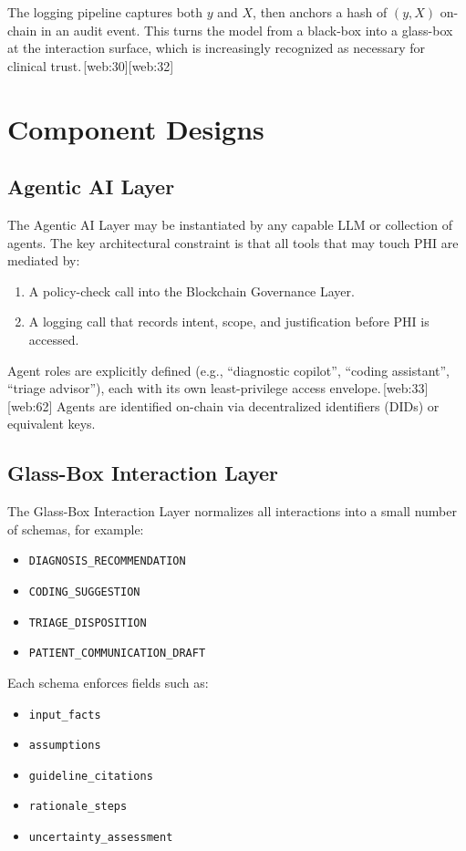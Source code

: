 \documentclass[11pt]{article}
\begin{document}
The logging pipeline captures both $y$ and $X$, then anchors a hash of $(y, X)$ on-chain in an audit event. 
This turns the model from a black-box into a glass-box at the interaction surface, which is increasingly recognized as necessary for clinical trust.\,[web:30][web:32]

\section{Component Designs}

\subsection{Agentic AI Layer}

The Agentic AI Layer may be instantiated by any capable LLM or collection of agents. 
The key architectural constraint is that all tools that may touch PHI are mediated by:
\begin{enumerate}[nosep]
  \item A policy-check call into the Blockchain Governance Layer.
  \item A logging call that records intent, scope, and justification before PHI is accessed.
\end{enumerate}

Agent roles are explicitly defined (e.g., ``diagnostic copilot'', ``coding assistant'', ``triage advisor''), each with its own least-privilege access envelope.\,[web:33][web:62] 
Agents are identified on-chain via decentralized identifiers (DIDs) or equivalent keys.

\subsection{Glass-Box Interaction Layer}

The Glass-Box Interaction Layer normalizes all interactions into a small number of schemas, for example:
\begin{itemize}[nosep]
  \item \texttt{DIAGNOSIS\_RECOMMENDATION}
  \item \texttt{CODING\_SUGGESTION}
  \item \texttt{TRIAGE\_DISPOSITION}
  \item \texttt{PATIENT\_COMMUNICATION\_DRAFT}
\end{itemize}

Each schema enforces fields such as:
\begin{itemize}[nosep]
  \item \texttt{input\_facts}
  \item \texttt{assumptions}
  \item \texttt{guideline\_citations}
  \item \texttt{rationale\_steps}
  \item \texttt{uncertainty\_assessment}
\end{itemize}
\end{document}
